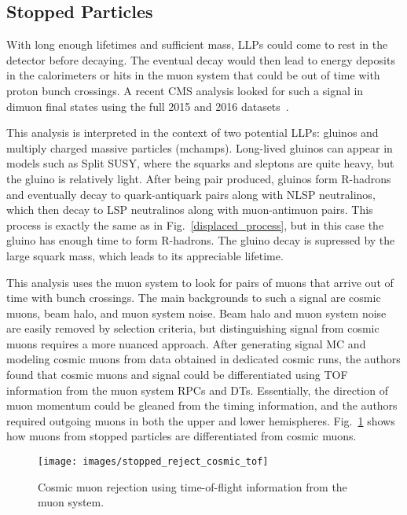 \documentclass[12pt]{article}
\begin{document}
    \subsection{Stopped Particles}
        With long enough lifetimes and sufficient mass, LLPs could come to rest in the detector before decaying. The eventual decay would then lead to energy deposits in the calorimeters or hits in the muon system that could be out of time with proton bunch crossings. A recent CMS analysis looked for such a signal in dimuon final states using the full 2015 and 2016 datasets~\cite{cms_stopped}. 

        This analysis is interpreted in the context of two potential LLPs: gluinos and multiply charged massive particles (mchamps). Long-lived gluinos can appear in models such as Split SUSY, where the squarks and sleptons are quite heavy, but the gluino is relatively light. After being pair produced, gluinos form R-hadrons and eventually decay to quark-antiquark pairs along with NLSP neutralinos, which then decay to LSP neutralinos along with muon-antimuon pairs. This process is exactly the same as in Fig.~\ref{displaced_process}, but in this case the gluino has enough time to form R-hadrons. The gluino decay is supressed by the large squark mass, which leads to its appreciable lifetime.

        This analysis uses the muon system to look for pairs of muons that arrive out of time with bunch crossings. The main backgrounds to such a signal are cosmic muons, beam halo, and muon system noise. Beam halo and muon system noise are easily removed by selection criteria, but distinguishing signal from cosmic muons requires a more nuanced approach. After generating signal MC and modeling cosmic muons from data obtained in dedicated cosmic runs, the authors found that cosmic muons and signal could be differentiated using TOF information from the muon system RPCs and DTs. Essentially, the direction of muon momentum could be gleaned from the timing information, and the authors required outgoing muons in both the upper and lower hemispheres. Fig.~\ref{stopped_muon_differentiation} shows how muons from stopped particles are differentiated from cosmic muons.
        
        \noindent \begin{figure}[htbp] \begin{center}
        \texttt{[image: images/stopped\_reject\_cosmic\_tof]}
            \caption{Cosmic muon rejection using time-of-flight information from the muon system.~\cite{cms_stopped}}
        \label{stopped_muon_differentiation}
        \end{center} \end{figure}
\end{document}
